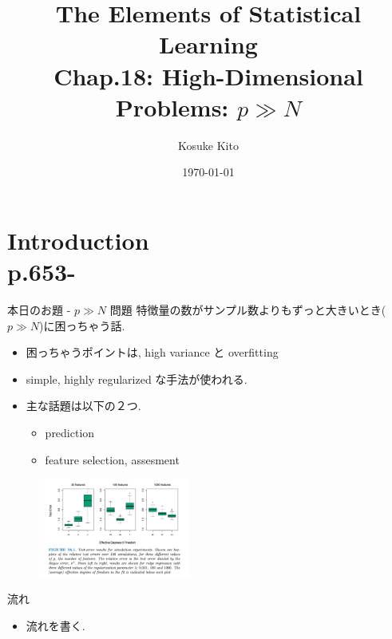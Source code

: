 \documentclass[dvipdfmx,8pt]{beamer}
\title{The Elements of Statistical Learning\\Chap.18: High-Dimensional Problems: $p \gg N$}
\date{\today}
\author{Kosuke Kito}
\begin{document}
  \maketitle
  \section{Introduction\\p.653-}
  \begin{frame}{本日のお題 - $p \gg N$ 問題}
    特徴量の数がサンプル数よりもずっと大きいとき($p \gg N$)に困っちゃう話.
    \begin{itemize}
      \item 困っちゃうポイントは, high variance と overfitting
      \item simple, highly regularized な手法が使われる.
      \item 主な話題は以下の２つ.
      \begin{itemize}
        \item prediction
        \item feature selection, assesment
      \end{itemize}
    \end{itemize}
    \begin{figure}[htb]
      \centering
      \includegraphics[width=5cm]{./images/test-error-in-high-demension.png}
    \end{figure}
  \end{frame}
  \begin{frame}{流れ}
    \begin{itemize}
      \item 流れを書く.
    \end{itemize}
  \end{frame}
\end{document}
